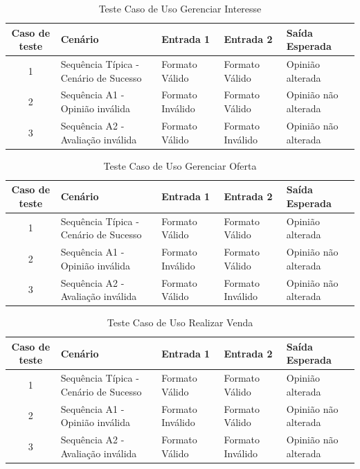 \documentclass[a4paper,11pt]{article}
\begin{document}
	\begin{center}
	\begin{table}[H]
		\begin{tabularx}{\textwidth}{c|X|X|X|X}
			\textbf{Caso de teste} & \textbf{Cenário} & \textbf{Entrada 1} & \textbf{Entrada 2} & \textbf{Saída Esperada} \\
			\hline
			1 & Sequência Típica - Cenário de Sucesso & Formato Válido & Formato Válido & Opinião alterada\\ \hline
			2 & Sequência A1 - Opinião inválida & Formato Inválido & Formato Válido & Opinião não alterada\\ \hline
			3 & Sequência A2 - Avaliação inválida & Formato Válido & Formato Inválido & Opinião não alterada\\ \hline
			
		\end{tabularx}
		\caption{Teste Caso de Uso Gerenciar Interesse}
	\end{table}
	\end{center}
	
	\begin{center}
	\begin{table}[H]
		\begin{tabularx}{\textwidth}{c|X|X|X|X}
			\textbf{Caso de teste} & \textbf{Cenário} & \textbf{Entrada 1} & \textbf{Entrada 2} & \textbf{Saída Esperada} \\
			\hline
			1 & Sequência Típica - Cenário de Sucesso & Formato Válido & Formato Válido & Opinião alterada\\ \hline
			2 & Sequência A1 - Opinião inválida & Formato Inválido & Formato Válido & Opinião não alterada\\ \hline
			3 & Sequência A2 - Avaliação inválida & Formato Válido & Formato Inválido & Opinião não alterada\\ \hline
			
		\end{tabularx}
		\caption{Teste Caso de Uso Gerenciar Oferta}
	\end{table}
	\end{center}
	
	\begin{center}
	\begin{table}[H]
		\begin{tabularx}{\textwidth}{c|X|X|X|X}
			\textbf{Caso de teste} & \textbf{Cenário} & \textbf{Entrada 1} & \textbf{Entrada 2} & \textbf{Saída Esperada} \\
			\hline
			1 & Sequência Típica - Cenário de Sucesso & Formato Válido & Formato Válido & Opinião alterada\\ \hline
			2 & Sequência A1 - Opinião inválida & Formato Inválido & Formato Válido & Opinião não alterada\\ \hline
			3 & Sequência A2 - Avaliação inválida & Formato Válido & Formato Inválido & Opinião não alterada\\ \hline
			
		\end{tabularx}
		\caption{Teste Caso de Uso Realizar Venda}
	\end{table}
	\end{center}
	
\end{document}
